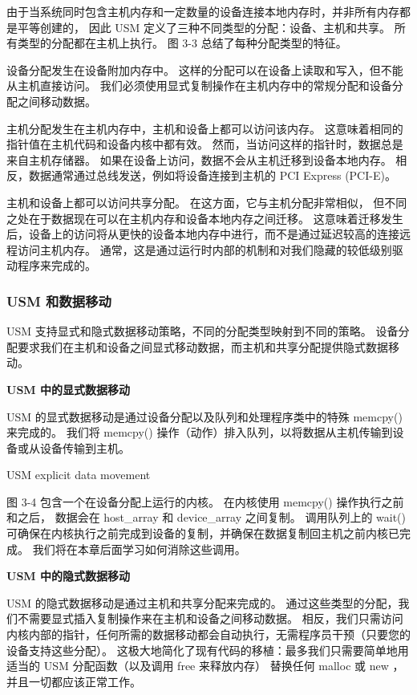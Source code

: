 由于当系统同时包含主机内存和一定数量的设备连接本地内存时，并非所有内存都是平等创建的，
因此 USM 定义了三种不同类型的分配：设备、主机和共享。 所有类型的分配都在主机上执行。 
图 3-3 总结了每种分配类型的特征。

设备分配发生在设备附加内存中。 这样的分配可以在设备上读取和写入，但不能从主机直接访问。 
我们必须使用显式复制操作在主机内存中的常规分配和设备分配之间移动数据。

主机分配发生在主机内存中，主机和设备上都可以访问该内存。 这意味着相同的指针值在主机代码和设备内核中都有效。 
然而，当访问这样的指针时，数据总是来自主机存储器。 如果在设备上访问，数据不会从主机迁移到设备本地内存。 
相反，数据通常通过总线发送，例如将设备连接到主机的 PCI Express (PCI-E)。

主机和设备上都可以访问共享分配。 在这方面，它与主机分配非常相似，
但不同之处在于数据现在可以在主机内存和设备本地内存之间迁移。 
这意味着迁移发生后，设备上的访问将从更快的设备本地内存中进行，而不是通过延迟较高的连接远程访问主机内存。 
通常，这是通过运行时内部的机制和对我们隐藏的较低级别驱动程序来完成的。

\subsubsection{USM 和数据移动}
USM 支持显式和隐式数据移动策略，不同的分配类型映射到不同的策略。 
设备分配要求我们在主机和设备之间显式移动数据，而主机和共享分配提供隐式数据移动。

\textbf{USM 中的显式数据移动}

USM 的显式数据移动是通过设备分配以及队列和处理程序类中的特殊 memcpy() 来完成的。 
我们将 memcpy() 操作（动作）排入队列，以将数据从主机传输到设备或从设备传输到主机。

{\color{red} USM explicit data movement }

图 3-4 包含一个在设备分配上运行的内核。 在内核使用 memcpy() 操作执行之前和之后，
数据会在 host\_array 和 device\_array 之间复制。 
调用队列上的 wait() 可确保在内核执行之前完成到设备的复制，并确保在数据复制回主机之前内核已完成。 
我们将在本章后面学习如何消除这些调用。

\textbf{USM 中的隐式数据移动}

USM 的隐式数据移动是通过主机和共享分配来完成的。 
通过这些类型的分配，我们不需要显式插入复制操作来在主机和设备之间移动数据。 
相反，我们只需访问内核内部的指针，任何所需的数据移动都会自动执行，无需程序员干预（只要您的设备支持这些分配）。 
这极大地简化了现有代码的移植：最多我们只需要简单地用适当的 USM 分配函数（以及调用 free 来释放内存）
替换任何 malloc 或 new ，并且一切都应该正常工作。

